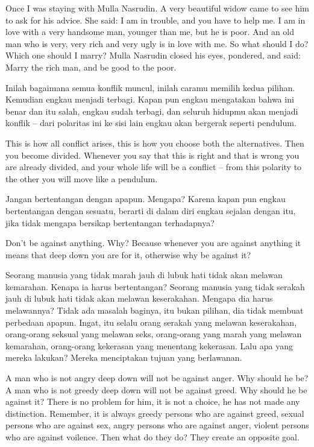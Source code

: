 \english
Once I was staying with Mulla Nasrudin. A very beautiful widow came to see him to ask for his advice. She said: I am in trouble, and you have to help me. I am in love with a very handsome man, younger than me, but he is poor. And an old man who is very, very rich and very ugly is in love with me. So what should I do? Which one should I marry? Mulla Nasrudin closed his eyes, pondered, and said: Marry the rich man, and be good to the poor.

\bahasa
Inilah bagaimana semua konflik muncul, inilah caramu memilih kedua pilihan. Kemudian engkau menjadi terbagi. Kapan pun engkau mengatakan bahwa ini benar dan itu salah, engkau sudah terbagi, dan seluruh hidupmu akan menjadi konflik -- dari polaritas ini ke sisi lain engkau akan bergerak seperti pendulum.

\english
This is how all conflict arises, this is how you choose both the alternatives. Then you become divided. Whenever you say that this is right and that is wrong you are already divided, and your whole life will be a conflict -- from this polarity to the other you will move like a pendulum.

\bahasa
Jangan bertentangan dengan apapun. Mengapa? Karena kapan pun engkau bertentangan dengan sesuatu, berarti di dalam diri engkau sejalan dengan itu, jika tidak mengapa bersikap bertentangan terhadapnya?

\english
Don't be against anything. Why? Because whenever you are against anything it means that deep down you are for it, otherwise why be against it?

\bahasa
Seorang manusia yang tidak marah jauh di lubuk hati tidak akan melawan kemarahan. Kenapa ia harus bertentangan? Seorang manusia yang tidak serakah jauh di lubuk hati tidak akan melawan keserakahan. Mengapa dia harus melawannya? Tidak ada masalah baginya, itu bukan pilihan, dia tidak membuat perbedaan apapun. Ingat, itu selalu orang serakah yang melawan keserakahan, orang-orang seksual yang melawan seks, orang-orang yang marah yang melawan kemarahan, orang-orang kekerasan yang menentang kekerasan. Lalu apa yang mereka lakukan? Mereka menciptakan tujuan yang berlawanan.

\english
A man who is not angry deep down will not be against anger. Why should he be? A man who is not greedy deep down will not be against greed. Why should he be against it? There is no problem for him, it is not a choice, he has not made any distinction. Remember, it is always greedy persons who are against greed, sexual persons who are against sex, angry persons who are against anger, violent persons who are against voilence. Then what do they do? They create an opposite goal.

